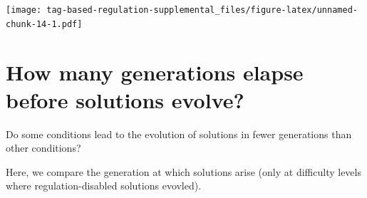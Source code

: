 \documentclass[
]{book}
\newenvironment{Shaded}{\begin{snugshade}}{\end{snugshade}}
\newcommand{\DecValTok}[1]{\textcolor[rgb]{0.00,0.00,0.81}{#1}}
\newcommand{\FunctionTok}[1]{\textcolor[rgb]{0.00,0.00,0.00}{#1}}
\newcommand{\NormalTok}[1]{#1}
\newcommand{\OtherTok}[1]{\textcolor[rgb]{0.56,0.35,0.01}{#1}}
\newcommand{\SpecialCharTok}[1]{\textcolor[rgb]{0.00,0.00,0.00}{#1}}
\newcommand{\StringTok}[1]{\textcolor[rgb]{0.31,0.60,0.02}{#1}}
\begin{document}
\texttt{[image: tag-based-regulation-supplemental\_files/figure-latex/unnamed-chunk-14-1.pdf]}

\hypertarget{how-many-generations-elapse-before-solutions-evolve}{%
\section{How many generations elapse before solutions evolve?}\label{how-many-generations-elapse-before-solutions-evolve}}

Do some conditions lead to the evolution of solutions in fewer generations than other conditions?

Here, we compare the generation at which solutions arise (only at difficulty levels where regulation-disabled solutions evovled).

\begin{Shaded}
\end{Shaded}
\end{document}
